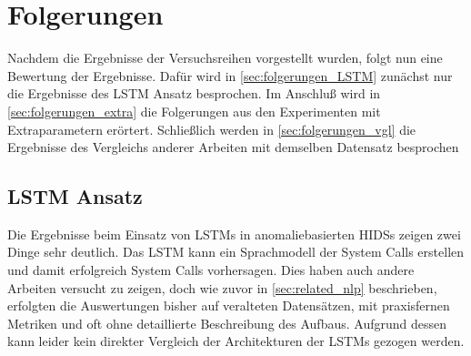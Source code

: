 \chapter{Folgerungen}\label{ch:folgerungen}
Nachdem die Ergebnisse der Versuchsreihen vorgestellt wurden, folgt nun eine Bewertung der Ergebnisse.
Dafür wird in \autoref{sec:folgerungen_LSTM} zunächst nur die Ergebnisse des \ac{LSTM} Ansatz besprochen.
Im Anschluß wird in \autoref{sec:folgerungen_extra} die Folgerungen aus den Experimenten mit Extraparametern erörtert. 
Schließlich werden in \autoref{sec:folgerungen_vgl} die Ergebnisse des Vergleichs anderer Arbeiten mit demselben Datensatz besprochen

\section{LSTM Ansatz}\label{sec:folgerungen_LSTM}

Die Ergebnisse beim Einsatz von \acp{LSTM} in anomaliebasierten \acp{HIDS} zeigen zwei Dinge sehr deutlich.
Das \ac{LSTM} kann ein Sprachmodell der System Calls erstellen und damit erfolgreich System Calls vorhersagen.
Dies haben auch andere Arbeiten versucht zu zeigen, doch wie zuvor in \autoref{sec:related_nlp} beschrieben, erfolgten die Auswertungen bisher auf veralteten Datensätzen, mit praxisfernen Metriken und oft ohne detaillierte Beschreibung des Aufbaus.
Aufgrund dessen kann leider kein direkter Vergleich der Architekturen der \acp{LSTM} gezogen werden.

